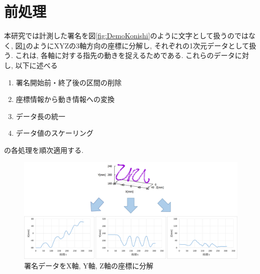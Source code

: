 \section{前処理}

本研究では計測した署名を図\ref{fig:DemoKonishi}のように文字として扱うのではなく, 図\ref{fig:PreProcessing1}のようにXYZの3軸方向の座標に分解し, それぞれの1次元データとして扱う. これは, 各軸に対する指先の動きを捉えるためである. これらのデータに対し, 以下に述べる
\\
\begin{enumerate}
  \item 署名開始前・終了後の区間の削除
  \item 座標情報から動き情報への変換
  \item データ長の統一
  \item データ値のスケーリング\\
\end{enumerate}
の各処理を順次適用する.
\\
\begin{figure}[htbp]
  \begin{center}
    \includegraphics[clip,width=16.0cm]{./images/PreProcessing1.png}
    \caption{署名データをX軸, Y軸, Z軸の座標に分解}
    \label{fig:PreProcessing1}
  \end{center}
\end{figure}\\

